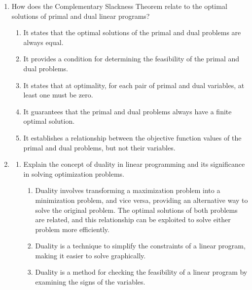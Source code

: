 \documentclass{article}%
\begin{document}
\begin{enumerate}
\begin{enumerate}
\item Strong duality implies that the primal and dual problems always have feasible solutions, regardless of the problem's constraints.%
\item Strong duality is only relevant when both the primal and dual problems are unbounded.%
\item Strong duality states that the optimal solution of the primal problem is always greater than the optimal solution of the dual problem.%
\end{enumerate}%
\vspace{1em}%
\item How does the Complementary Slackness Theorem relate to the optimal solutions of primal and dual linear programs?%
\begin{enumerate}%
\item It states that the optimal solutions of the primal and dual problems are always equal.%
\item It provides a condition for determining the feasibility of the primal and dual problems.%
\item It states that at optimality, for each pair of primal and dual variables, at least one must be zero.%
\item It guarantees that the primal and dual problems always have a finite optimal solution.%
\item It establishes a relationship between the objective function values of the primal and dual problems, but not their variables.%
\end{enumerate}%
\vspace{1em}%
\item%
\begin{enumerate}%
\item Explain the concept of duality in linear programming and its significance in solving optimization problems.%
\begin{enumerate}%
\item Duality involves transforming a maximization problem into a minimization problem, and vice versa, providing an alternative way to solve the original problem.  The optimal solutions of both problems are related, and this relationship can be exploited to solve either problem more efficiently.%
\item Duality is a technique to simplify the constraints of a linear program, making it easier to solve graphically.%
\item Duality is a method for checking the feasibility of a linear program by examining the signs of the variables.%

\end{enumerate}
\end{enumerate}
\end{enumerate}
\end{document}
